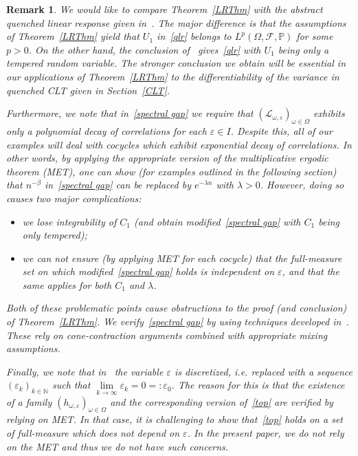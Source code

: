 \documentclass[11pt,reqno,a4paper]{article}
\theoremstyle{special}
\newtheorem{remark}[theorem]{Remark}
\renewcommand{\epsilon}{\varepsilon}
\renewcommand{\L}{\mathcal{L}}
\def\N{\mathbb{N}}
\begin{document}
\begin{remark}\label{comp}
We would like to compare Theorem~\ref{LRThm} with the abstract quenched linear response given in~\cite[Theorem 11]{DGS}.
The major difference is that the assumptions of Theorem~\ref{LRThm} yield that $U_1$ in~\eqref{qlr} belongs to $L^p(\Omega, \mathcal F, \mathbb P)$ for some $p>0$. On the other hand, the conclusion of~\cite[Theorem 11]{DGS} gives~\eqref{qlr} with $U_1$ being only a tempered random variable.
The stronger conclusion we obtain will be essential in our applications of Theorem~\ref{LRThm} to the differentiability of the variance in quenched CLT given in Section~\ref{CLT}.

Furthermore, we note that in~\eqref{spectral gap} we require that $(\L_{\omega, \epsilon})_{\omega \in \Omega}$ exhibits only a polynomial decay of correlations for each $\epsilon \in I$. Despite this,  all of our examples will deal with cocycles which exhibit exponential decay of correlations. In other words, by applying the appropriate version of the multiplicative ergodic theorem (MET), one can show (for examples outlined in the following section) that $n^{-\beta}$ in~\eqref{spectral gap} can be replaced by $e^{-\lambda n}$ with $\lambda>0$. However, doing so causes two major complications:
\begin{itemize}
\item we lose integrability of $C_1$ (and obtain modified~\eqref{spectral gap} with $C_1$ being only tempered);
\item we can not ensure (by applying MET for each cocycle) that the full-measure set on which modified~\eqref{spectral gap} holds is independent on $\epsilon$, and that the same applies for both $C_1$ and $\lambda$.
\end{itemize}
Both of these problematic points cause obstructions to the proof (and conclusion) of Theorem~\ref{LRThm}. We verify~\eqref{spectral gap}  by using techniques developed in~\cite{YH 23}. These  rely on cone-contraction arguments combined with appropriate mixing assumptions.



Finally, we note that in~\cite[Theorem 11]{DGS} the variable $\epsilon$ is discretized, i.e. replaced with a sequence $(\epsilon_k)_{k\in \N}$ such that $\lim\limits_{k\to \infty}\epsilon_k=0=:\epsilon_0$. The reason for this is that the existence of a family $(h_{\omega, \epsilon})_{\omega \in \Omega}$ and the corresponding version of~\eqref{top} are verified by relying on MET. In that case, it is challenging to show that~\eqref{top} holds on a set of full-measure which does not depend on $\epsilon$. In the present paper, we do not rely on the MET and thus we do not have such concerns.
\end{remark}
\end{document}
